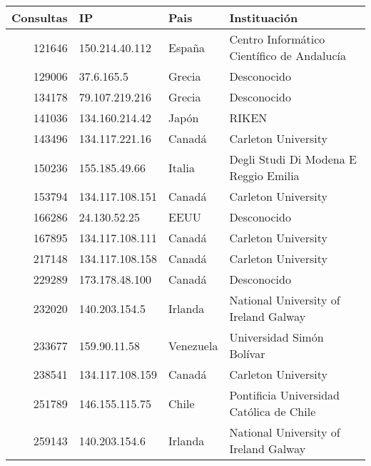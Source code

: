 \begin{table}[ht]
  \centering
  \begin{tabular}{|r|l|l|l|} \hline
    \bf{Consultas} & \bf{IP} & \bf{Pais} & \bf{Instituación} \\\hline
    121646  & 150.214.40.112  & España         
                   & Centro Informático Científico de Andalucía\\\hline
    129006  & 37.6.165.5      & Grecia         
                   & Desconocido\\\hline
    134178  & 79.107.219.216  & Grecia         
                   & Desconocido\\\hline
    141036  & 134.160.214.42  & Japón          
                   & RIKEN\\\hline
    143496  & 134.117.221.16  & Canadá         
                   & Carleton University\\\hline
    150236  & 155.185.49.66   & Italia         
                   & Degli Studi Di Modena E Reggio Emilia\\\hline
    153794  & 134.117.108.151 & Canadá         
                   & Carleton University\\\hline
    166286  & 24.130.52.25    & EEUU 
                   & Desconocido\\\hline
    167895  & 134.117.108.111 & Canadá         
                   & Carleton University\\\hline
    217148  & 134.117.108.158 & Canadá         
                   & Carleton University\\\hline
    229289  & 173.178.48.100  & Canadá         
                   & Desconocido\\\hline
    232020  & 140.203.154.5   & Irlanda        
                   & National University of Ireland Galway\\\hline
    233677  & 159.90.11.58    & Venezuela      
                   & Universidad Simón Bolívar\\\hline
    238541  & 134.117.108.159 & Canadá         
                   & Carleton University\\\hline
    251789  & 146.155.115.75  & Chile          
                   & Pontificia Universidad Católica de Chile\\\hline
    259143  & 140.203.154.6   & Irlanda        
                   & National University of Ireland Galway\\\hline

\end{tabular}
\end{table}

